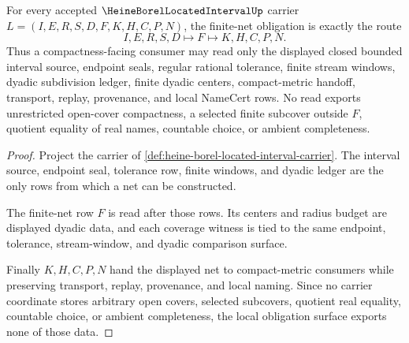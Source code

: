 \begin{theorem}
\label{thm:heine-borel-located-interval-net-obligation}
For every accepted $\HeineBorelLocatedIntervalUp$ carrier $L=(I,E,R,S,D,F,K,H,C,P,N)$, the finite-net obligation is exactly the route
$$
I,E,R,S,D
\longmapsto
F
\longmapsto
K,H,C,P,N .
$$
Thus a compactness-facing consumer may read only the displayed closed bounded interval source, endpoint seals, regular rational tolerance, finite stream windows, dyadic subdivision ledger, finite dyadic centers, compact-metric handoff, transport, replay, provenance, and local NameCert rows. No read exports unrestricted open-cover compactness, a selected finite subcover outside $F$, quotient equality of real names, countable choice, or ambient completeness.
\end{theorem}
\begin{proof}
Project the carrier of \autoref{def:heine-borel-located-interval-carrier}. The interval source, endpoint seal, tolerance row, finite windows, and dyadic ledger are the only rows from which a net can be constructed.

The finite-net row $F$ is read after those rows. Its centers and radius budget are displayed dyadic data, and each coverage witness is tied to the same endpoint, tolerance, stream-window, and dyadic comparison surface.

Finally $K,H,C,P,N$ hand the displayed net to compact-metric consumers while preserving transport, replay, provenance, and local naming. Since no carrier coordinate stores arbitrary open covers, selected subcovers, quotient real equality, countable choice, or ambient completeness, the local obligation surface exports none of those data.
\end{proof}

